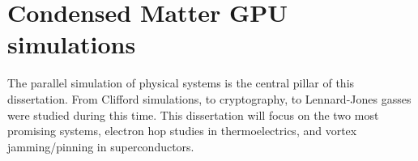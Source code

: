 \section{Condensed Matter GPU simulations}
The parallel simulation of physical systems is the central pillar of this dissertation. From Clifford simulations, to cryptography, to Lennard-Jones gasses were studied during this time. This dissertation will focus on the two most promising systems, electron hop studies in thermoelectrics, and vortex jamming/pinning in superconductors.

